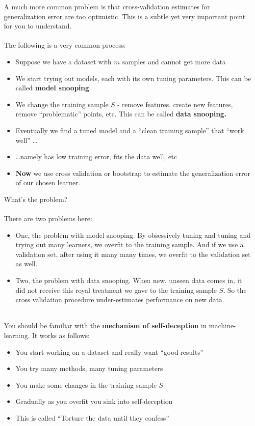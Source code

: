 \documentclass[11pt]{article}
\begin{document}
A much more common problem is that cross-validation estimates for generalization
error are too optimistic. This is a subtle yet very important point for you to
understand.  
\\~\\
The following is a very common process:
\begin{itemize}
      \item Suppose we have a dataset with $m$ samples and cannot get more data
      \item We start trying out models, each with its own tuning parameters.
        This can be called {\bf model snooping}
      \item We change the training sample $S$ - remove features, create new
        features, 
        remove ``problematic'' points, etc. This can be called {\bf data
        snooping.} 
      \item Eventually we find a tuned model and a ``clean training sample'' that ``work well'' \ldots
      \item \ldots namely has low training error, fits the data well, etc
      \item {\bf Now} we use cross validation or bootstrap to estimate the
        generalization error of our chosen learner.
    \end{itemize}

    What's the problem? 
\\~\\
    There are two problems here:
    \begin{itemize}
      \item 
    One, the problem with model snooping. By obsessively tuning and tuning and trying out many learners, we overfit to
    the training sample. And if we use a validation set, after using it many
    many times, we overfit to the validation set as well.
  \item
    Two, the problem with data snooping. When new, unseen data comes in, it did not receive this
    royal treatment we gave to the training sample $S$. So the cross validation
    procedure under-estimates performance on new data.

\end{itemize}

~\\   
You should be familiar with the {\bf mechanism of self-deception} 
in machine-learning. It works as follows:
    \begin{itemize}
      \item You start working on a dataset and really want ``good results''
      \item You try many methods, many tuning parameters
      \item You make some changes in the training sample $S$ 
      \item Gradually as you overfit you sink into self-deception
      \item This is called ``Torture the data until they confess''
    \end{itemize}
\end{document}
